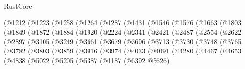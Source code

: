 \begin{lexlean}{RustCore}
\begin{coremodule}
    (@1212
      (@1223
        (@1258
          (@1264
            (@1287
              (@1431
                (@1546
                  (@1576
                    (@1663
                      (@1803
                        (@1849
                          (@1872
                            (@1884
                              (@1920
                                (@2224
                                  (@2341
                                    (@2421
                                      (@2487
                                        (@2554
                                          (@2622
                                            (@2897
                                              (@3105
                                                (@3249
                                                  (@3661
                                                    (@3679
                                                      (@3696
                                                        (@3713
                                                          (@3730
                                                            (@3748
                                                              (@3765
                                                                (@3782
                                                                  (@3803
                                                                    (@3859
                                                                      (@3916
                                                                        (@3974
                                                                          (@4033
                                                                            (@4091
                                                                              (@4280
                                                                                (@4467
                                                                                  (@4653
                                                                                    (@4838
                                                                                      (@5022
                                                                                        (@5205
                                                                                          (@5387
                                                                                            (@1187
                                                                                              (@5392
                                                                                                @5626)

\end{coremodule}
\end{lexlean}
